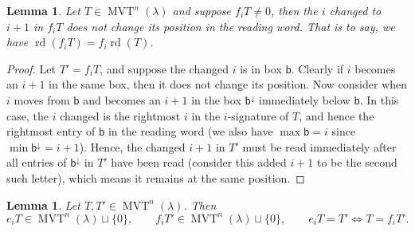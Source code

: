 \documentclass[10pt]{amsart}
\newtheorem{lemma}[theo]{Lemma}
\theoremstyle{definition}
\newcommand{\bbb}{\mathsf{b}}
\DeclareMathOperator{\rd}{rd} %
\DeclareMathOperator{\mvt}{MVT} %
\begin{document}
\begin{lemma}
\label{lemma:fixed_reading}
Let $T \in \mvt^n(\lambda)$ and suppose $f_i T \neq 0$, then the $i$ changed to $i+1$ in $f_i T$ does not change its position in the reading word.
That is to say, we have $\rd(f_i T) = f_i \rd(T)$.
\end{lemma}

\begin{proof}
Let $T' = f_i T$, and suppose the changed $i$ is in box $\bbb$.
Clearly if $i$ becomes an $i+1$ in the same box, then it does not change its position.
Now consider when $i$ moves from $\bbb$ and becomes an $i+1$ in the box $\bbb^{\downarrow}$ immediately below $\bbb$. In this case, the $i$ changed is the rightmost $i$ in the $i$-signature of $T$, and hence the rightmost entry of $\bbb$ in the reading word (we also have $\max \bbb = i$ since $\min \bbb^{\downarrow} = i+1$). Hence, the changed $i+1$ in $T'$ must be read immediately after all entries of $\bbb^{\downarrow}$ in $T'$ have been read (consider this added $i+1$ to be the second such letter), which means it remains at the same position.
\end{proof}
\setcounter{theo}{6}
\begin{lemma}
\label{lemma:mvt_ops_well_defined}
Let $T, T' \in \mvt^n(\lambda)$. Then
\[
e_i T \in \mvt^n(\lambda) \sqcup \{0\},
\qquad
f_i T' \in \mvt^n(\lambda) \sqcup \{0\},
\qquad
e_i T = T' \Longleftrightarrow T = f_i T'.
\]
\end{lemma}
\end{document}

